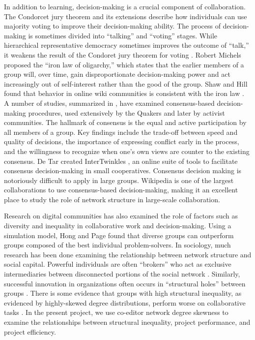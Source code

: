 In addition to learning, decision-making is a crucial component of collaboration.
The Condorcet jury theorem and its extensions \cite{list_epistemic_2001}
describe how individuals can use majority voting to improve their
decision-making ability.
The process of decision-making is sometimes divided into
``talking'' and ``voting'' stages.
While hierarchical representative democracy sometimes improves the outcome
of ``talk,'' it weakens the result of the Condoret jury theorem for voting
\cite{}.
Robert Michels proposed the ``iron law of oligarchy,''
\cite{michels_political_1999} which states that
the earlier members of a group will, over time, gain disproportionate
decision-making power and act increasingly out of self-interest rather than
the good of the group.
Shaw and Hill found that behavior in online wiki communities is consistent
with the iron law \cite{shaw_laboratories_2014}.
A number of studies, summarized in \cite{gentry_consensus_1982},
have examined consensus-based decision-making procedures, used extensively by
the Quakers and later by activist communities.
The hallmark of consensus is the equal and active participation by all members
of a group.
Key findings include the trade-off between speed and quality of decisions,
the importance of expressing conflict early in the process,
and the willingness to recognize when one's own views are counter to the
existing consensus.
De Tar created InterTwinkles \cite{detar_intertwinkles:_2013},
an online suite of tools to facilitate consensus decision-making
in small cooperatives.
Consensus decision making is notoriously difficult to apply in large groups.
Wikipedia is one of the largest collaborations to use consensus-based
decision-making,
making it an excellent place to study the role of network structure in
large-scale collaboration.

Research on digital communities has also examined the role of factors
such as diversity and inequality
in collaborative work and decision-making.
Using a simulation model, Hong and Page \cite{hong_groups_2004} found that
diverse groups can outperform groups composed of the best individual
problem-solvers.
In sociology, much research has been done examining the relationship between
network structure and social capital.
Powerful individuals are often ``brokers''
who act as exclusive intermediaries between disconnected portions of the
social network \mbox{\cite{silverman_patronage_1965}}.
Similarly, successful innovation in organizations often occurs in ``structural
holes'' between groups \mbox{\cite{granovetter_strength_1973}}.
There is some evidence that groups with high structural inequality,
as evidenced by highly-skewed degree distributions,
perform worse on collaborative tasks \mbox{\cite{kearns_experiments_2012}}.
In the present project, we use co-editor network degree skewness to
examine the relationships between structural inequality,
project performance, and project efficiency.

